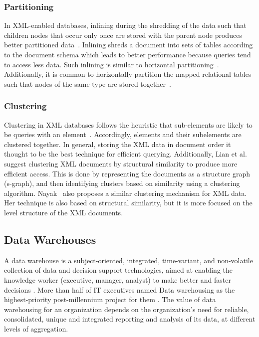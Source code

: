 \documentclass[12pt,a4paper]{article}
\begin{document}
\subsubsection{Partitioning}
In XML-enabled databases, inlining during the shredding of the data such that children nodes that occur only once are stored with the parent node produces
better partitioned data~\cite{tatarinov2002storing}. Inlining shreds a document into sets of tables according to the document schema which leads to better
performance because queries tend to access less data. Such inlining is similar to horizontal partitioning~\cite{ramanath2003searching}. Additionally, it is
common to horizontally partition the mapped relational tables such that nodes of the same type are stored together~\cite{amer2002overview}.

\subsubsection{Clustering}
Clustering in XML databases follows the heuristic that sub-elements are likely to be queries with an element~\cite{jagadish2002timber}. Accordingly, elements
and their subelements are clustered together. In general, storing the XML data in document order it thought to be the best technique for efficient querying.
Additionally, Lian et al.~\cite{lian2004efficient} suggest clustering XML documents by structural similarity to produce more efficient access. This is done by
representing the documents as a structure graph (s-graph), and then identifying clusters based on similarity using a clustering algorithm.
Nayak~\cite{nayak2008fast} also proposes a similar clustering mechanism for XML data. Her technique is also based on structural similarity, but it is more
focused on the level structure of the XML documents.


\subsection{Data Warehouses}
\label{SEC-WAREHOUSES}
A data warehouse is a subject-oriented, integrated, time-variant, and non-volatile collection of data and decision support technologies, aimed at enabling the
knowledge worker (executive, manager, analyst) to make better and faster decisions \cite{inmon2002building, chaudhuri1997overview}. More than half of IT
executives named Data warehousing as the highest-priority post-millennium project for them \cite{sen2005comparison}. The value of data warehousing for an
organization depends on the organization's need for reliable, consolidated, unique and integrated reporting and analysis of its data, at different levels of
aggregation.
\end{document}
